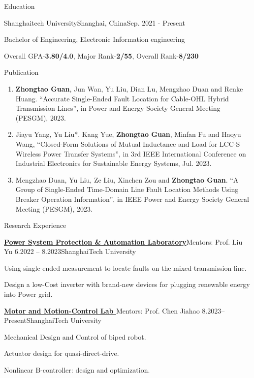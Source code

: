 \documentclass[]{ZhongtaoGuan-resume}
\begin{document}
\resumeheader
{}
{}
{}
{}
{}

\begin{section}{Education}
 \begin{subsectionnobullet}{Shanghaitech University}{Shanghai, China}{Sep. 2021 - Present}{}
     \item{Bachelor of Engineering, Electronic Information engineering}
     \item{Overall GPA-\textbf{3.80/4.0}, Major Rank-\textbf{2/55}, Overall Rank-\textbf{8/230}}
 \end{subsectionnobullet}
\end{section}

\begin{section}{Publication}
 \begin{enumerate}
     \item \textbf{Zhongtao Guan}, Jun Wan, Yu Liu, Dian Lu, Mengzhao Duan and Renke Huang. “Accurate Single-Ended Fault Location for Cable-OHL Hybrid Transmission Lines”, in Power and Energy Society General Meeting (PESGM), 2023. %
     \item Jiayu Yang, Yu Liu*, Kang Yue, \textbf{Zhongtao Guan}, Minfan Fu and Haoyu Wang, “Closed-Form Solutions of Mutual Inductance and Load for LCC-S Wireless Power Transfer Systems”, in 3rd IEEE International Conference on Industrial Electronics for Sustainable Energy Systems, Jul. 2023.
     \item Mengzhao Duan, Yu Liu, Ze Liu, Xinchen Zou and \textbf{Zhongtao Guan}. “A Group of Single-Ended Time-Domain Line Fault Location Methods Using Breaker Operation Information”, in IEEE Power and Energy Society General Meeting (PESGM), 2023.%
 \end{enumerate}
\end{section}

\begin{section}{Research Experience}
 \begin{subsection}{\textbf{\href{https://pspal.shanghaitech.edu.cn/}{Power System Protection \& Automation Laboratory}}}{Mentors: Prof. Liu Yu}{ 6.2022 -- 8.2023}{ShanghaiTech University}
     \item{Using single-ended measurement to locate faults on the mixed-transmission line.}
     \item{Design a low-Cost inverter with brand-new devices for plugging renewable energy into Power grid.}
 \end{subsection}
 \begin{subsection}{ \textbf{\href{https://faculty.sist.shanghaitech.edu.cn/chenjh/}{Motor and Motion-Control Lab }}}{Mentors: Prof. Chen Jiahao}{ 8.2023--Present}{ShanghaiTech University}
     \item{Mechanical Design and Control of biped robot.}
     \item{Actuator design for quasi-direct-drive.}
     \item {Nonlinear B-controller: design and optimization.}
 \end{subsection}
\end{section}
\end{document}

